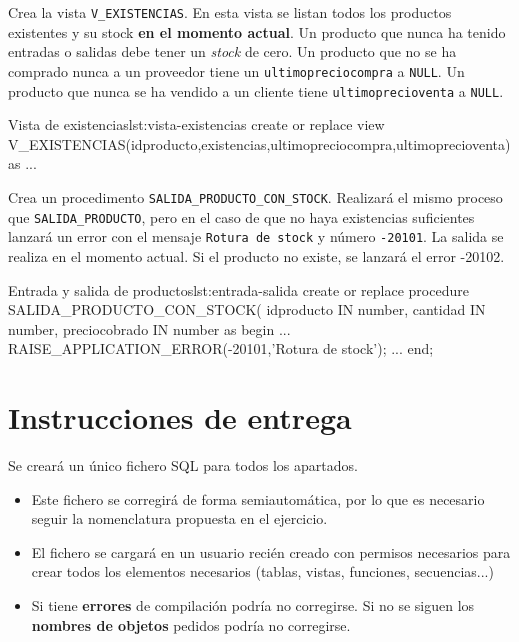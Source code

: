 \begin{homeworkProblem}

  Crea la vista \texttt{V\_EXISTENCIAS}. En esta vista se listan todos los productos existentes y su stock \textbf{en el momento actual}. Un producto que nunca ha tenido entradas o salidas debe tener un \textit{stock} de cero. Un producto que no se ha comprado nunca a un proveedor tiene un \texttt{ultimopreciocompra} a \texttt{NULL}. Un producto que nunca se ha vendido a un cliente tiene \texttt{ultimoprecioventa} a \texttt{NULL}.

  \begin{listadosql}{Vista de existencias}{lst:vista-existencias}
create or replace view V_EXISTENCIAS(idproducto,existencias,ultimopreciocompra,ultimoprecioventa) as
...
  \end{listadosql}  
  
\end{homeworkProblem}



\begin{homeworkProblem}

  Crea un procedimento \texttt{SALIDA\_PRODUCTO\_CON\_STOCK}. Realizará el mismo proceso que \texttt{SALIDA\_PRODUCTO}, pero en el caso de que no haya existencias suficientes lanzará un error con el mensaje \texttt{Rotura de stock} y número \texttt{-20101}. La salida se realiza en el momento actual.
  Si el producto no existe, se lanzará el error -20102.

  \begin{listadosql}{Entrada y salida de productos}{lst:entrada-salida}
create or replace procedure SALIDA_PRODUCTO_CON_STOCK(
  idproducto IN number,
  cantidad IN number,
  preciocobrado IN number
as
begin
  ...
  RAISE_APPLICATION_ERROR(-20101,'Rotura de stock');
  ...
end; 
  \end{listadosql}
  
\end{homeworkProblem}


\section{Instrucciones de entrega}
Se creará un único fichero SQL para todos los apartados.
\begin{itemize}
\item Este fichero se corregirá de forma semiautomática, por lo que es necesario seguir la nomenclatura propuesta en el ejercicio.
\item El fichero se cargará en un usuario recién creado con permisos necesarios para crear todos los elementos necesarios (tablas, vistas, funciones, secuencias...)
\item Si tiene \textbf{errores} de compilación podría no corregirse. Si no se siguen los \textbf{nombres de objetos} pedidos podría no corregirse.
\end{itemize}

